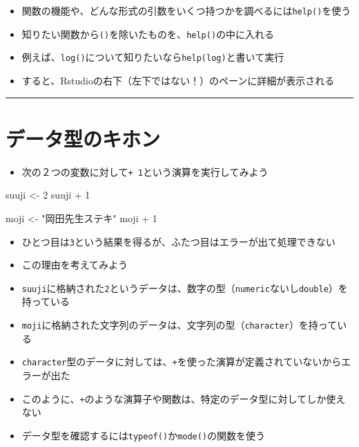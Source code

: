 \documentclass[
]{book}
\newenvironment{Shaded}{\begin{snugshade}}{\end{snugshade}}
\newcommand{\DecValTok}[1]{\textcolor[rgb]{0.00,0.00,0.81}{#1}}
\newcommand{\NormalTok}[1]{#1}
\newcommand{\OtherTok}[1]{\textcolor[rgb]{0.56,0.35,0.01}{#1}}
\newcommand{\SpecialCharTok}[1]{\textcolor[rgb]{0.00,0.00,0.00}{#1}}
\newcommand{\StringTok}[1]{\textcolor[rgb]{0.31,0.60,0.02}{#1}}
\providecommand{\tightlist}{%
  \setlength{\itemsep}{0pt}\setlength{\parskip}{0pt}}
\begin{document}
\begin{itemize}
\tightlist
\item
  関数の機能や、どんな形式の引数をいくつ持つかを調べるには\texttt{help()}を使う
\item
  知りたい関数から\texttt{()}を除いたものを、\texttt{help()}の中に入れる
\item
  例えば、\texttt{log()}について知りたいなら\texttt{help(log)}と書いて実行
\item
  すると、Rstudioの右下（左下ではない！）のペーンに詳細が表示される
\end{itemize}

\begin{center}\rule{0.5\linewidth}{0.5pt}\end{center}

\hypertarget{ux30c7ux30fcux30bfux578bux306eux30adux30dbux30f3}{%
\section{データ型のキホン}\label{ux30c7ux30fcux30bfux578bux306eux30adux30dbux30f3}}

\begin{itemize}
\tightlist
\item
  次の２つの変数に対して\texttt{+\ 1}という演算を実行してみよう
\end{itemize}

\begin{Shaded}
\begin{Highlighting}[]
\NormalTok{suuji }\OtherTok{\textless{}{-}} \DecValTok{2} 
\NormalTok{suuji }\SpecialCharTok{+} \DecValTok{1} 

\NormalTok{moji }\OtherTok{\textless{}{-}} \StringTok{"岡田先生ステキ"}
\NormalTok{moji }\SpecialCharTok{+} \DecValTok{1}
\end{Highlighting}
\end{Shaded}

\begin{itemize}
\tightlist
\item
  ひとつ目は\texttt{3}という結果を得るが、ふたつ目はエラーが出て処理できない
\item
  この理由を考えてみよう
\item
  \texttt{suuji}に格納された\texttt{2}というデータは、数字の型（\texttt{numeric}ないし\texttt{double}）を持っている\\
\item
  \texttt{moji}に格納された文字列のデータは、文字列の型（\texttt{character}）を持っている\\
\item
  \texttt{character}型のデータに対しては、\texttt{+}を使った演算が定義されていないからエラーが出た\\
\item
  このように、\texttt{+}のような演算子や関数は、特定のデータ型に対してしか使えない
\item
  データ型を確認するには\texttt{typeof()}か\texttt{mode()}の関数を使う
\end{itemize}
\end{document}
